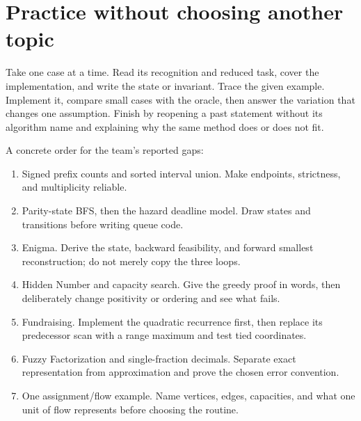\section{Practice without choosing another topic}
Take one case at a time. Read its recognition and reduced task, cover the
implementation, and write the state or invariant. Trace the given example.
Implement it, compare small cases with the oracle, then answer the variation
that changes one assumption. Finish by reopening a past statement without
its algorithm name and explaining why the same method does or does not fit.

A concrete order for the team's reported gaps:
\begin{enumerate}
\item Signed prefix counts and sorted interval union. Make endpoints,
strictness, and multiplicity reliable.
\item Parity-state BFS, then the hazard deadline model. Draw states and
transitions before writing queue code.
\item Enigma. Derive the state, backward feasibility, and forward smallest
reconstruction; do not merely copy the three loops.
\item Hidden Number and capacity search. Give the greedy proof in words,
then deliberately change positivity or ordering and see what fails.
\item Fundraising. Implement the quadratic recurrence first, then replace
its predecessor scan with a range maximum and test tied coordinates.
\item Fuzzy Factorization and single-fraction decimals. Separate exact
representation from approximation and prove the chosen error convention.
\item One assignment/flow example. Name vertices, edges, capacities, and
what one unit of flow represents before choosing the routine.
\end{enumerate}

